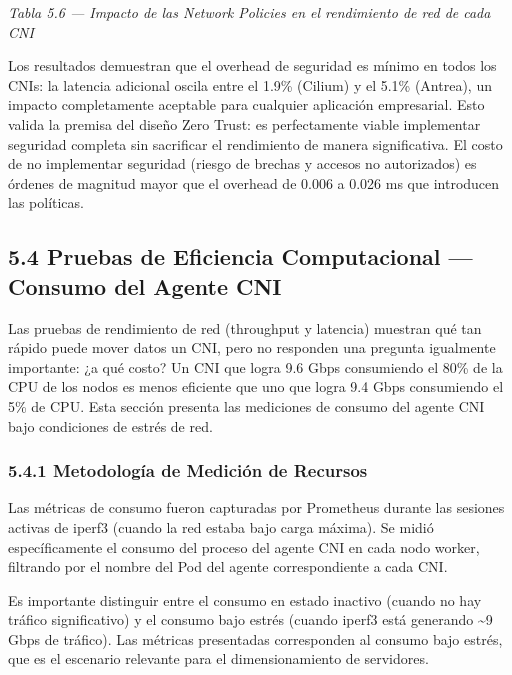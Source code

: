 \documentclass[journal]{IEEEtran}
\begin{document}
\begin{center}\emph{\emph{Tabla 5.6 --- Impacto de las Network Policies en el rendimiento de red de cada CNI}}\end{center}

Los resultados demuestran que el overhead de seguridad es mínimo en todos los CNIs: la latencia adicional oscila entre el 1.9\% (Cilium) y el 5.1\% (Antrea), un impacto completamente aceptable para cualquier aplicación empresarial. Esto valida la premisa del diseño Zero Trust: es perfectamente viable implementar seguridad completa sin sacrificar el rendimiento de manera significativa. El costo de no implementar seguridad (riesgo de brechas y accesos no autorizados) es órdenes de magnitud mayor que el overhead de 0.006 a 0.026 ms que introducen las políticas.

\subsection{5.4 Pruebas de Eficiencia Computacional --- Consumo del Agente CNI}

Las pruebas de rendimiento de red (throughput y latencia) muestran qué tan rápido puede mover datos un CNI, pero no responden una pregunta igualmente importante: ¿a qué costo? Un CNI que logra 9.6 Gbps consumiendo el 80\% de la CPU de los nodos es menos eficiente que uno que logra 9.4 Gbps consumiendo el 5\% de CPU. Esta sección presenta las mediciones de consumo del agente CNI bajo condiciones de estrés de red.

\subsubsection{5.4.1 Metodología de Medición de Recursos}

Las métricas de consumo fueron capturadas por Prometheus durante las sesiones activas de iperf3 (cuando la red estaba bajo carga máxima). Se midió específicamente el consumo del proceso del agente CNI en cada nodo worker, filtrando por el nombre del Pod del agente correspondiente a cada CNI.

Es importante distinguir entre el consumo en estado inactivo (cuando no hay tráfico significativo) y el consumo bajo estrés (cuando iperf3 está generando \textasciitilde{}9 Gbps de tráfico). Las métricas presentadas corresponden al consumo bajo estrés, que es el escenario relevante para el dimensionamiento de servidores.
\end{document}

